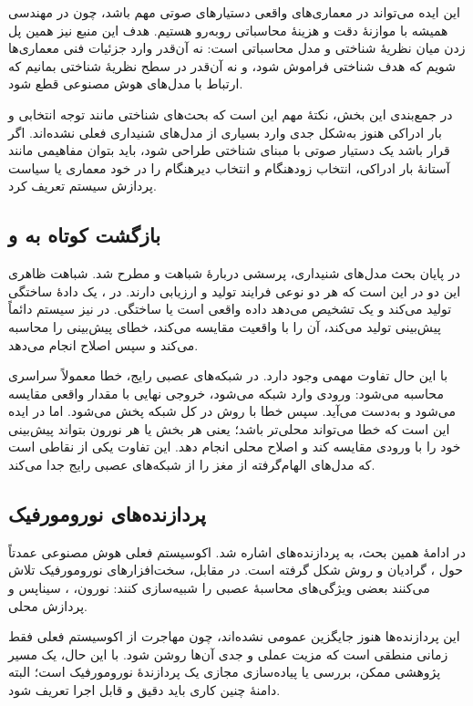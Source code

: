این ایده می‌تواند در معماری‌های واقعی دستیارهای صوتی مهم باشد، چون در مهندسی همیشه با موازنهٔ دقت و هزینهٔ محاسباتی روبه‌رو هستیم. هدف این منبع نیز همین پل زدن میان نظریهٔ شناختی و مدل محاسباتی است: نه آن‌قدر وارد جزئیات فنی معماری‌ها شویم که هدف شناختی فراموش شود، و نه آن‌قدر در سطح نظریهٔ شناختی بمانیم که ارتباط با مدل‌های هوش مصنوعی قطع شود.

در جمع‌بندی این بخش، نکتهٔ مهم این است که بحث‌های شناختی مانند توجه انتخابی و بار ادراکی هنوز به‌شکل جدی وارد بسیاری از مدل‌های شنیداری فعلی نشده‌اند. اگر قرار باشد یک دستیار صوتی با مبنای شناختی طراحی شود، باید بتوان مفاهیمی مانند آستانهٔ بار ادراکی، انتخاب زودهنگام و انتخاب دیرهنگام را در خود معماری یا سیاست پردازش سیستم تعریف کرد.

\subsection{بازگشت کوتاه به  و }
در پایان بحث مدل‌های شنیداری، پرسشی دربارهٔ شباهت  و  مطرح شد. شباهت ظاهری این دو در این است که هر دو نوعی فرایند تولید و ارزیابی دارند. در ، یک  دادهٔ ساختگی تولید می‌کند و یک  تشخیص می‌دهد داده واقعی است یا ساختگی. در  نیز سیستم دائماً پیش‌بینی تولید می‌کند، آن را با واقعیت مقایسه می‌کند، خطای پیش‌بینی را محاسبه می‌کند و سپس اصلاح انجام می‌دهد.

با این حال تفاوت مهمی وجود دارد. در شبکه‌های عصبی رایج، خطا معمولاً سراسری محاسبه می‌شود: ورودی وارد شبکه می‌شود، خروجی نهایی با مقدار واقعی مقایسه می‌شود و  به‌دست می‌آید. سپس خطا با روش  در کل شبکه پخش می‌شود. اما در  ایده این است که خطا می‌تواند محلی‌تر باشد؛ یعنی هر بخش یا هر نورون بتواند پیش‌بینی خود را با ورودی مقایسه کند و اصلاح محلی انجام دهد. این تفاوت یکی از نقاطی است که مدل‌های الهام‌گرفته از مغز را از شبکه‌های عصبی رایج جدا می‌کند.

\subsection{پردازنده‌های نورومورفیک}
در ادامهٔ همین بحث، به پردازنده‌های  اشاره شد. اکوسیستم فعلی هوش مصنوعی عمدتاً حول ، گرادیان و روش  شکل گرفته است. در مقابل، سخت‌افزارهای نورومورفیک تلاش می‌کنند بعضی ویژگی‌های محاسبهٔ عصبی را شبیه‌سازی کنند: نورون، ، سیناپس و پردازش محلی.

این پردازنده‌ها هنوز جایگزین عمومی  نشده‌اند، چون مهاجرت از اکوسیستم فعلی فقط زمانی منطقی است که مزیت عملی و جدی آن‌ها روشن شود. با این حال، یک مسیر پژوهشی ممکن، بررسی یا پیاده‌سازی مجازی یک پردازندهٔ نورومورفیک است؛ البته دامنهٔ چنین کاری باید دقیق و قابل اجرا تعریف شود.
